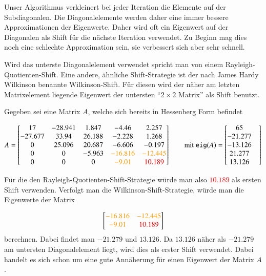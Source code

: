Unser Algorithmus verkleinert bei jeder Iteration die Elemente auf der Subdiagonalen.
Die Diagonalelemente werden daher eine immer bessere Approximationen der Eigenwerte.
Daher wird oft ein Eigenwert auf der Diagonalen als Shift für die nächste Iteration verwendet.
Zu Beginn mag dies noch eine schlechte Approximation sein, sie verbessert sich aber sehr schnell.

Wird das unterste Diagonalelement verwendet spricht man von einem Rayleigh-Quotienten-Shift.
Eine andere, ähnliche Shift-Strategie ist der nach James Hardy Wilkinson benannte Wilkinson-Shift.
Für diesen wird der näher am letzten Matrixelement liegende Eigenwert der untersten "`$2\times2$ Matrix"' als Shift benutzt.


\begin{beispiel}
	Gegeben sei eine Matrix $A$, welche sich bereits in Hessenberg Form befindet
	
	\begin{equation}
	A=
	\begin{bmatrix}
	17 & -28.941 & 1.847 & -4.46 & 2.257\\
	-27.677 & 33.94 & 26.188 & -2.228 & 1.268\\
	0 & 25.096 & 20.687 & -6.606 & -0.197\\
	0 & 0 & -5.963 & \textcolor{orange}{-16.816} & \textcolor{orange}{-12.445}\\
	0 & 0 & 0 & \textcolor{orange}{-9.01} & \textcolor{red}{10.189}\\
	\end{bmatrix} 
	\qquad
	\text{mit }
	\texttt{eig}(A)=
	\begin{bmatrix}
	65 & \\
	-21.277 & \\
	-13.126 & \\
	21.277 & \\
	13.126 & \\
	\end{bmatrix}
	\end{equation}
	
	Für die den Rayleigh-Quotienten-Shift-Strategie würde man also \textcolor{red}{$10.189$} als ersten Shift verwenden.
	Verfolgt man die Wilkinson-Shift-Strategie, würde man die Eigenwerte der Matrix

	\begin{equation}
	\begin{bmatrix}
	 \textcolor{orange}{-16.816} & \textcolor{orange}{-12.445}\\
	 \textcolor{orange}{-9.01} & \textcolor{red}{10.189}\\
	\end{bmatrix}
	\end{equation}
	berechnen.
	Dabei findet man $-21.279$ und $13.126$.
	Da $13.126$ näher als $-21.279$ am untersten Diagonalelement liegt, wird dies als erster Shift verwendet.
	Dabei handelt es sich schon um eine gute Annäherung für einen Eigenwert der Matrix $A$.	
\end{beispiel}



